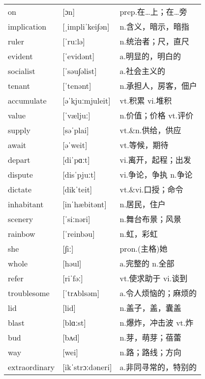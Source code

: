 \documentclass[a4paper]{article}
\begin{document}
\section{}
\begin{tabular}{l l l}

on & [ɔn] & prep.在…上；在…旁 \\
implication & [ˌimpliˈkei∫ən] & n.含义，暗示，暗指 \\
ruler & [ˈruːlə] & n.统治者；尺，直尺 \\
evident & [ˈevidənt] & a.明显的，明白的 \\
socialist & [ˈsəu∫əlist] & a.社会主义的 \\
tenant & [ˈtenənt] & n.承担人，房客，佃户 \\
accumulate & [əˈkjuːmjuleit] & vt.积累 vi.堆积 \\
value & [ˈvæljuː] & n.价值；价格 vt.评价 \\
supply & [səˈplai] & vt.\&n.供给，供应 \\
await & [əˈweit] & vt.等候，期待 \\
depart & [diˈpɑːt] & vi.离开，起程；出发 \\
dispute & [disˈpjuːt] & vi.争论，争执 n.争论 \\
dictate & [dikˈteit] & vt.\&vi.口授；命令 \\
inhabitant & [inˈhæbitənt] & n.居民，住户 \\
scenery & [ˈsiːnəri] & n.舞台布景；风景 \\
rainbow & [ˈreinbəu] & n.虹，彩虹 \\
she & [∫iː] & pron.(主格)她 \\
whole & [həul] & a.完整的 n.全部 \\
refer & [riˈfəː] & vt.使求助于 vi.谈到 \\
troublesome & [ˈtrʌblsəm] & a.令人烦恼的；麻烦的 \\
lid & [lid] & n.盖子，盖，囊盖 \\
blast & [blɑːst] & n.爆炸，冲击波 vt.炸 \\
bud & [bʌd] & n.芽，萌芽；蓓蕾 \\
way & [wei] & n.路；路线；方向 \\
extraordinary & [ikˈstrɔːdəneri] & a.非同寻常的，特别的 \\

\end{tabular}
\end{document}
